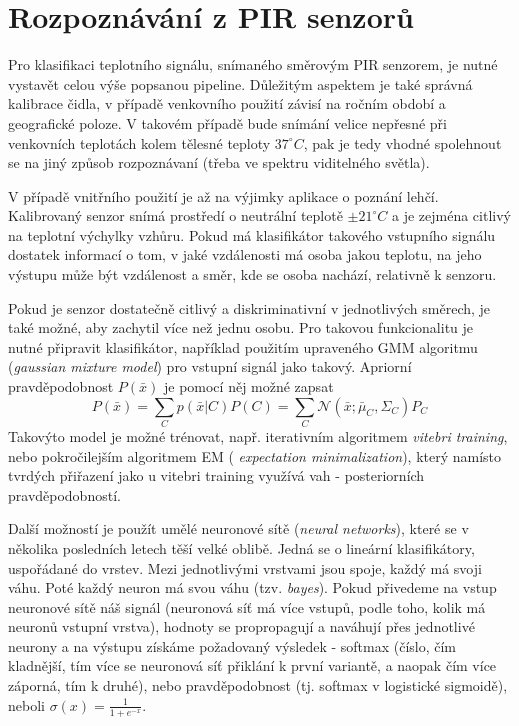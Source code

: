 \documentclass[10pt,a4paper]{article}
\begin{document}
  \section{Rozpoznávání z PIR senzorů}
  Pro klasifikaci teplotního signálu, snímaného směrovým PIR senzorem, je nutné vystavět celou
  výše popsanou pipeline. Důležitým aspektem je také správná kalibrace čidla, v případě venkovního
  použití závisí na ročním období a geografické poloze. V takovém případě bude snímání velice nepřesné
  při venkovních teplotách kolem tělesné teploty $37^{\circ}C$, pak je tedy vhodné
  spolehnout se na jiný způsob rozpoznávaní (třeba ve spektru viditelného světla).

  V případě vnitřního použití je až na výjimky aplikace o poznání lehčí. Kalibrovaný senzor snímá prostředí
  o neutrální teplotě $\pm 21^{\circ}C$ a je zejména citlivý na teplotní výchylky vzhůru.
  Pokud má klasifikátor takového vstupního signálu dostatek informací o tom, v jaké vzdálenosti má
  osoba jakou teplotu, na jeho výstupu může být vzdálenost a směr, kde se osoba nachází, relativně k senzoru.

  Pokud je senzor dostatečně citlivý a diskriminativní v jednotlivých směrech, je také možné, aby zachytil
  více než jednu osobu. Pro takovou funkcionalitu je nutné připravit klasifikátor, například použitím
  upraveného GMM algoritmu ({\it gaussian mixture model}) pro vstupní signál jako takový. Apriorní
  pravděpodobnost $P(\bar{x})$ je pomocí něj možné zapsat $$P(\bar{x}) = \sum_{C} p(\bar{x} | C)
  P(C) = \sum_{C} \mathcal{N}(\bar{x}; \bar{\mu}_C,\Sigma_C) P_C$$ Takovýto model je možné trénovat,
  např. iterativním algoritmem {\it vitebri training}, nebo pokročilejším algoritmem EM ({\it
  expectation minimalization}), který namísto tvrdých přiřazení jako u vitebri training využívá vah
  - posteriorních pravděpodobností.

  Další možností je použít umělé neuronové sítě ({\it neural networks}), které se v několika posledních
  letech těší velké oblibě. Jedná se o lineární klasifikátory, uspořádané do vrstev. Mezi jednotlivými
  vrstvami jsou spoje, každý má svoji váhu. Poté každý neuron má svou váhu (tzv. {\it bayes}). Pokud
  přivedeme na vstup neuronové sítě náš signál (neuronová síť má více vstupů, podle toho, kolik má
  neuronů vstupní vrstva), hodnoty se propropagují a naváhují přes jednotlivé neurony a na výstupu
  získáme požadovaný výsledek - softmax (číslo, čím kladnější, tím více se neuronová síť přiklání
  k první variantě, a naopak čím více záporná, tím k druhé), nebo pravděpodobnost (tj. softmax v
  logistické sigmoidě), neboli $\sigma(x) = \frac{1}{1 + e^{-x}}$.
\end{document}
